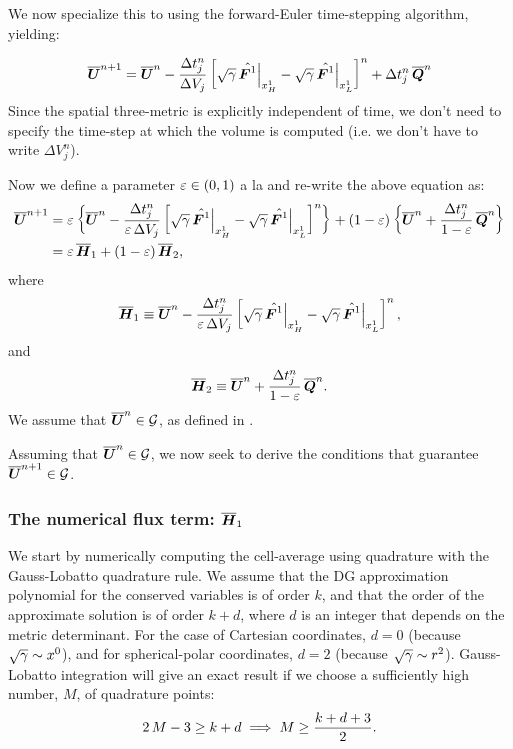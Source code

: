  We now specialize this to using the forward-Euler time-stepping algorithm, yielding:

\begin{equation}
    \overline{\boldsymbol{U}}^{n+1}=\overline{\boldsymbol{U}}^{n}-\frac{\Delta t^{n}_{j}}{\Delta V_{j}}\left[\sqrt{\gamma}\,\hat{\boldsymbol{F}^{1}}\Big|_{x^{1}_{H}}-\sqrt{\gamma}\,\hat{\boldsymbol{F}^{1}}\Big|_{x^{1}_{L}}\right]^{n}+\Delta t^{n}_{j}\,\overline{\boldsymbol{Q}}^{n}
\end{equation}
 Since the spatial three-metric is explicitly independent of time, we don't need to specify the time-step at which the volume is computed (i.e. we don't have to write $\Delta V^{n}_{j}$).

Now we define a parameter $\varepsilon\in\left(0,1\right)$ a la \citet{ZS2011b} and re-write the above equation as:
\begin{align}
    \overline{\boldsymbol{U}}^{n+1}&=\varepsilon\left\{\overline{\boldsymbol{U}}^{n}-\frac{\Delta t^{n}_{j}}{\varepsilon\,\Delta V_{j}}\left[\sqrt{\gamma}\,\hat{\boldsymbol{F}^{1}}\Big|_{x^{1}_{H}}-\sqrt{\gamma}\,\hat{\boldsymbol{F}^{1}}\Big|_{x^{1}_{L}}\right]^{n}\right\}+\left(1-\varepsilon\right)\left\{\overline{\boldsymbol{U}}^{n}+\frac{\Delta t^{n}_{j}}{1-\varepsilon}\,\overline{\boldsymbol{Q}}^{n}\right\}\\
    &=\varepsilon\,\overline{\boldsymbol{H}}_{1}+\left(1-\varepsilon\right)\overline{\boldsymbol{H}}_{2},
\end{align}
where
\begin{equation}\label{Eq:H1}
    \overline{\boldsymbol{H}}_{1}\equiv\overline{\boldsymbol{U}}^{n}-\frac{\Delta t^{n}_{j}}{\varepsilon\,\Delta V_{j}}\left[\sqrt{\gamma}\,\hat{\boldsymbol{F}^{1}}\Big|_{x^{1}_{H}}-\sqrt{\gamma}\,\hat{\boldsymbol{F}^{1}}\Big|_{x^{1}_{L}}\right]^{n},
\end{equation}
and
\begin{equation}
    \overline{\boldsymbol{H}}_{2}\equiv\overline{\boldsymbol{U}}^{n}+\frac{\Delta t^{n}_{j}}{1-\varepsilon}\,\overline{\boldsymbol{Q}}^{n}.
\end{equation}
 We assume that $\overline{\boldsymbol{U}}^{n}\in\mathcal{G}$, as defined in \citet{Mignone2005}.

Assuming that $\overline{\boldsymbol{U}}^{n}\in\mathcal{G}$, we now seek to derive the conditions that guarantee $\overline{\boldsymbol{U}}^{n+1}\in\mathcal{G}$.

\subsubsection{The numerical flux term: $\overline{\boldsymbol{H}}_{1}$}

We start by numerically computing the cell-average using quadrature with the Gauss-Lobatto quadrature rule. We assume that the DG approximation polynomial for the conserved variables is of order $k$, and that the order of the approximate solution is of order $k+d$, where $d$ is an integer that depends on the metric determinant. For the case of Cartesian coordinates, $d=0$ (because $\sqrt{\gamma}\sim x^{0}$), and for spherical-polar coordinates, $d=2$ (because $\sqrt{\gamma}\sim r^{2}$). Gauss-Lobatto integration will give an exact result if we choose a sufficiently high number, $M$, of quadrature points:
\begin{equation}
    2\,M-3\geq k+d\implies M\geq\frac{k+d+3}{2}.
\end{equation}

